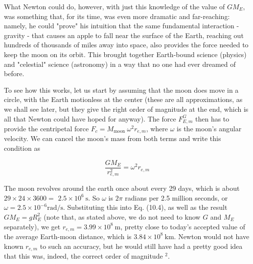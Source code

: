 \documentclass[10pt]{article}
\begin{document}
What Newton could do, however, with just this knowledge of the value of $G M_{E}$, was something that, for its time, was even more dramatic and far-reaching: namely, he could "prove" his intuition that the same fundamental interaction - gravity - that causes an apple to fall near the surface of the Earth, reaching out hundreds of thousands of miles away into space, also provides the force needed to keep the moon on its orbit. This brought together Earth-bound science (physics) and "celestial" science (astronomy) in a way that no one had ever dreamed of before.

To see how this works, let us start by assuming that the moon does move in a circle, with the Earth motionless at the center (these are all approximations, as we shall see later, but they give the right order of magnitude at the end, which is all that Newton could have hoped for anyway). The force $F_{E, m}^{G}$ then has to provide the centripetal force $F_{c}=M_{\text {moon }} \omega^{2} r_{e, m}$, where $\omega$ is the moon's angular velocity. We can cancel the moon's mass from both terms and write this condition as


\begin{equation*}
\frac{G M_{E}}{r_{e, m}^{2}}=\omega^{2} r_{e, m} \tag{10.4}
\end{equation*}


The moon revolves around the earth once about every 29 days, which is about $29 \times 24 \times 3600=$ $2.5 \times 10^{6} \mathrm{~s}$. So $\omega$ is $2 \pi$ radians per 2.5 million seconds, or $\omega=2.5 \times 10^{-6} \mathrm{rad} / \mathrm{s}$. Substituting this into Eq. (10.4), as well as the result $G M_{E}=g R_{E}^{2}$ (note that, as stated above, we do not need to know $G$ and $M_{E}$ separately), we get $r_{e, m}=3.99 \times 10^{8} \mathrm{~m}$, pretty close to today's accepted value of the average Earth-moon distance, which is $3.84 \times 10^{8} \mathrm{~km}$. Newton would not have known $r_{e, m}$ to such an accuracy, but he would still have had a pretty good idea that this was, indeed, the correct order of magnitude ${ }^{2}$.
\end{document}
